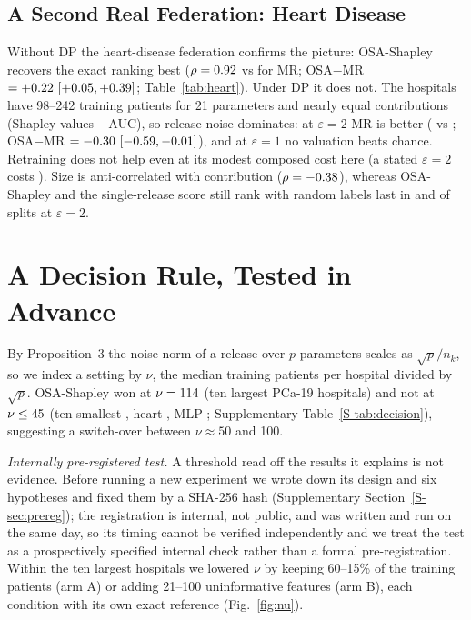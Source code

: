 \subsection{A Second Real Federation: Heart Disease}
\label{sec:heart}
Without DP the heart-disease federation confirms the picture: OSA-Shapley recovers the exact ranking best ($\rho=0.92$ vs \hrMrNoDP{} for MR; OSA$-$MR $=+0.22\ [+0.05, +0.39]$; Table~\ref{tab:heart}). Under DP it does not. The hospitals have 98--242 training patients for 21 parameters and nearly equal contributions (Shapley values \hrPhiMin--\hrPhiMax{} AUC), so release noise dominates: at $\varepsilon=2$ MR is better (\hrMrTwo{} vs \hrOsaTwo; OSA$-$MR $=-0.30\ [-0.59, -0.01]$), and at $\varepsilon=1$ no valuation beats chance. Retraining does not help even at its modest composed cost here (a stated $\varepsilon=2$ costs \hrTrueTwo). Size is anti-correlated with contribution ($\rho=-0.38$), whereas OSA-Shapley and the single-release score still rank \hrCorrupt{} with random labels last in \hrCOsaTwo{} and \hrCRefTwo{} of splits at $\varepsilon=2$.



\section{A Decision Rule, Tested in Advance}
\label{sec:rule}
By Proposition~3 the noise norm of a release over $p$ parameters scales as $\sqrt p/n_k$, so we index a setting by $\nu$, the median training patients per hospital divided by $\sqrt p$. OSA-Shapley won at $\nu=114$ (ten largest PCa-19 hospitals) and not at $\nu\le45$ (ten smallest \nuSmall, heart \nuHeart, MLP \nuMlp; Supplementary Table~\ref{S-tab:decision}), suggesting a switch-over between $\nu\approx50$ and 100.

\emph{Internally pre-registered test.} A threshold read off the results it explains is not evidence. Before running a new experiment we wrote down its design and six hypotheses and fixed them by a SHA-256 hash (Supplementary Section~\ref{S-sec:prereg}); the registration is internal, not public, and was written and run on the same day, so its timing cannot be verified independently and we treat the test as a prospectively specified internal check rather than a formal pre-registration. Within the ten largest hospitals we lowered $\nu$ by keeping 60--15\% of the training patients (arm A) or adding 21--100 uninformative features (arm B), each condition with its own exact reference (Fig.~\ref{fig:nu}).

